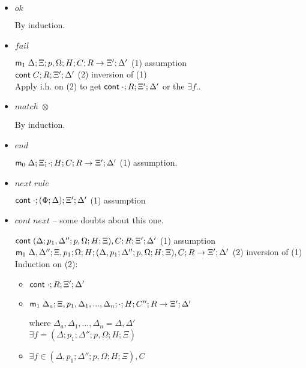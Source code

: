 \documentclass[9pt]{article}
\begin{document}
\begin{itemize}
   \item $ok$
   
   By induction.
   
   \item $fail$
   
   $\mathsf{m}_1 \; \Delta; \Xi; p, \Omega; H; C; R \rightarrow \Xi'; \Delta'$ \hfill (1) assumption \\
   $\mathsf{cont} \; C; R; \Xi'; \Delta'$ \hfill (2) inversion of (1) \\
   Apply i.h. on (2) to get $\mathsf{cont} \; \cdot; R; \Xi'; \Delta'$ or the $\exists f.$.
   
   \item $match \; \otimes$
   
   By induction.
   
   \item $end$
   
   $\mathsf{m}_0 \; \Delta; \Xi; \cdot; H; C; R \rightarrow \Xi'; \Delta'$ \hfill (1) assumption.\\
   
   \item $next \; rule$
   
   $\mathsf{cont} \; \cdot; (\Phi; \Delta); \Xi'; \Delta'$ \hfill (1) assumption \\
   
   \item $cont \; next$ -- some doubts about this one.
   
   $\mathsf{cont} \; (\Delta; p_1, \Delta''; p, \Omega; H; \Xi), C; R; \Xi'; \Delta'$ \hfill (1) assumption \\
   $\mathsf{m}_1 \; \Delta, \Delta''; \Xi, p_1;  \Omega; H; (\Delta, p_1; \Delta''; p, \Omega; H; \Xi), C; R \rightarrow \Xi'; \Delta'$ \hfill (2) inversion of (1)\\
   Induction on (2):
   
   \begin{itemize}
      \item $\mathsf{cont} \; \cdot; R; \Xi'; \Delta'$
      
      \item $\mathsf{m}_1 \; \Delta_a; \Xi, p_1, \Delta_1, ..., \Delta_n; \cdot; H; C''; R \rightarrow \Xi'; \Delta'$ 
      
      where $\Delta_a, \Delta_1, ..., \Delta_n = \Delta, \Delta'$ \\
      
      $\exists f = (\Delta; p_1; \Delta''; p, \Omega; H; \Xi)$
      
      \item $\exists f \in (\Delta, p_1; \Delta''; p, \Omega; H; \Xi), C$
      

\end{itemize}
\end{itemize}
\end{document}
